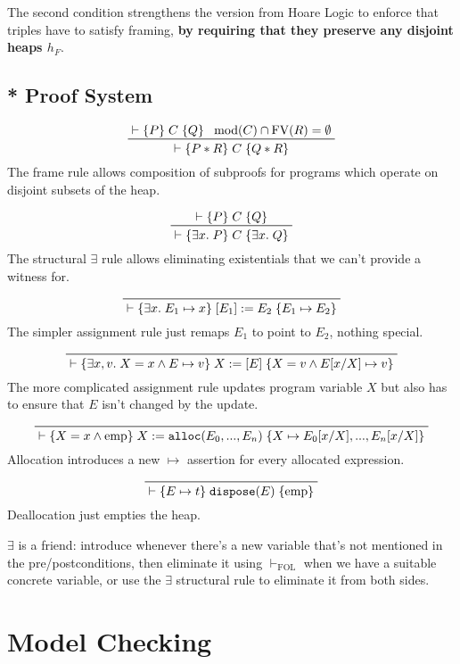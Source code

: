 \documentclass[a4paper, 11pt]{article}
\newcommand{\triple}[3]{\{#1\}\;#2\;\{#3\}}
\begin{document}
{    The second condition strengthens the version from Hoare Logic to enforce that triples have to satisfy framing, \textbf{by requiring that they preserve any disjoint heaps \(h_F\)}.

    \subsection*{* Proof System}
    {
        \begin{adjustwidth}{2cm}{2cm}
        \centering
        \[
        \prftree[r]{}
        {\vdash\triple{P}{C}{Q}}
        {\text{mod}(C) \cap \text{FV}(R) = \emptyset}
        {\vdash\triple{P*R}{C}{Q*R}}
        \]
        The frame rule allows composition of subproofs for programs which operate on disjoint subsets of the heap.

        \[
        \prftree[r]{}
        {\vdash\triple{P}{C}{Q}}
        {\vdash\triple{\exists x.\;P}{C}{\exists x.\;Q}}
        \]
        The structural \(\exists\) rule allows eliminating existentials that we can't provide a witness for.

        \[
        \prftree[r]{}
        {\vdash\triple{\exists x.\;E_1 \mapsto x}{[E_1] := E_2}{E_1 \mapsto E_2}}
        \]
        The simpler assignment rule just remaps \(E_1\) to point to \(E_2\), nothing special.

        \[
        \prftree[r]{}
        {\vdash\triple{\exists x, v.\; X = x \wedge E \mapsto v}{X := [E]}{X = v \wedge E[x/X] \mapsto v}}
        \]
        The more complicated assignment rule updates program variable \(X\) but also has to ensure that \(E\) isn't changed by the update.

        \[
        \prftree[r]{}
        {\vdash\triple{X = x \wedge \text{emp}}{X := \texttt{alloc}(E_0,...,E_n)}{X \mapsto E_0[x/X], ..., E_n[x/X]}}
        \]
        Allocation introduces a new \(\mapsto\) assertion for every allocated expression.

        \[
        \prftree[r]{}
        {\vdash\triple{E \mapsto t}{\texttt{dispose}(E)}{\text{emp}}}
        \]
        Deallocation just empties the heap.
        \end{adjustwidth}

        \(\exists\) is a friend: introduce whenever there's a new variable that's not mentioned in the pre/postconditions, then eliminate it using \(\vdash_\text{FOL}\) when we have a suitable concrete variable, or use the \(\exists\) structural rule to eliminate it from both sides.

    }

}
\section*{Model Checking}
{

}
\end{document}
